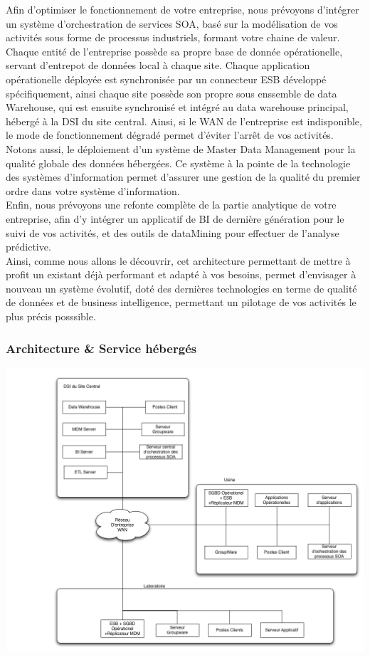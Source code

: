 Afin d'optimiser le fonctionnement de votre entreprise, nous prévoyons d'intégrer un système d'orchestration de services SOA, basé sur la modélisation de vos activités sous forme de processus industriels, formant votre chaine de valeur.\\
Chaque entité de l'entreprise possède sa propre base de donnée opérationelle, servant d'entrepot de données local à chaque site. Chaque application opérationelle déployée est synchronisée par un connecteur ESB développé spécifiquement, ainsi chaque site possède son propre sous enssemble de data Warehouse, qui est ensuite synchronisé et intégré au data warehouse principal, hébergé à la DSI du site central. Ainsi, si le WAN de l'entreprise est indisponible, le mode de fonctionnement dégradé permet d'éviter l'arrêt de vos activités.\\
Notons aussi, le déploiement d'un système de Master Data Management pour la qualité globale des données hébergées. Ce système à la pointe de la technologie des systèmes d'information permet d'assurer une gestion de la qualité du premier ordre dans votre système d'information.\\
Enfin, nous prévoyons une refonte complète de la partie analytique de votre entreprise, afin d'y intégrer un applicatif de BI de dernière génération pour le suivi de vos activités, et des outils de dataMining pour effectuer de l'analyse prédictive.\\

Ainsi, comme nous allons le découvrir, cet architecture permettant de mettre  à profit un existant déjà performant et adapté à vos besoins, permet d'envisager à nouveau un système évolutif, doté des dernières technologies en terme de qualité de données et de business intelligence, permettant un pilotage de vos activités le plus précis posssible.\\

\subsubsection{Architecture \& Service hébergés}

\includegraphics[scale=0.2]{DiagrameSOAPdc4.png}

